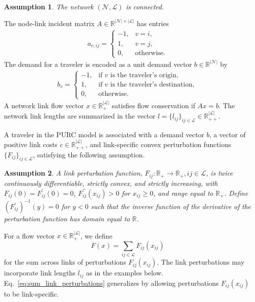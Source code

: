 \documentclass[a4paper,11pt]{article}
\newtheorem{assumption}{Assumption}
\begin{document}
\begin{assumption}
\label{A:1} The network $(\mathcal{N},\mathcal{L})$ is connected.
\end{assumption}

The node-link incident matrix $A\in \mathbb{R}^{|\mathcal{N}| \times |%
\mathcal{L}|}$ has entries 
\begin{align*}
a_{v, ij}=%
\begin{cases}
-1,& v=i, \\ 
1,& v=j, \\ 
0,& \text{otherwise}.%
\end{cases}%
\end{align*}
The demand for a traveler is encoded as a unit demand vector $b\in \mathbb{R} ^{|\mathcal{N}|}$ by
\begin{align*}
b_v = 
\begin{cases}
-1, & \text{if $v$ is the traveler's origin}, \\ 
1, & \text{if $v$ is the traveler's destination}, \\ 
0, & \text{otherwise}.%
\end{cases}%
\end{align*}
A network link flow vector $x\in \mathbb{R}_+^{|\mathcal{L}|}$ satisfies flow conservation if $Ax=b$. The network link lengths are summarized in the vector $l = \{l_{ij}\}_{ij \in \mathcal{L}}\in \mathbb{R}_{++}^{|\mathcal{L}|}$.

A traveler in the PURC model is associated with a demand vector $b$, a vector of positive link costs $c\in \mathbb{R}_{++}^{|\mathcal{L}|}$, and link-specific convex perturbation functions $\{F_{ij}\}_{ij \in \mathcal L}$, satisfying the following assumption.

\begin{assumption}
\label{A:2} A link perturbation function, $F_{ij}:\mathbb{R}_+ \rightarrow \mathbb{R%
}_+,  ij \in \mathcal{L}$, is twice continuously differentiable, strictly convex, and strictly increasing, with $F_{ij}(0)=F^{\prime }_{ij}(0)=0$,  $F^{\prime \prime}_{ij}(x_{ij})>0$ for $x_{ij}\geq 0$, and range equal to $\mathbb{R}_+$. Define $(F^{\prime }_{ij})^{-1} (y)=0$ for $y<0$ such
that the inverse function of the derivative of the perturbation function has domain equal to $\mathbb{R}$.
\end{assumption}

For a flow vector $x\in \mathbb{R}_{+}^{|\mathcal{L}|}$, we define 
\begin{equation}\label{eq:sum_link_perturbations}
F(x)=\sum_{ij\in \mathcal{L}}F_{ij}(x_{ij})
\end{equation}%
for the sum across links of perturbations $F_{ij}(x_{ij})$. The link perturbations may incorporate link lengths $l_{ij}$ as in the examples below. Eq.~\eqref{eq:sum_link_perturbations} generalizes \citet{Fosgerau2021a} by allowing perturbations $F_{ij}(x_{ij})$ to be link-specific.
\end{document}
